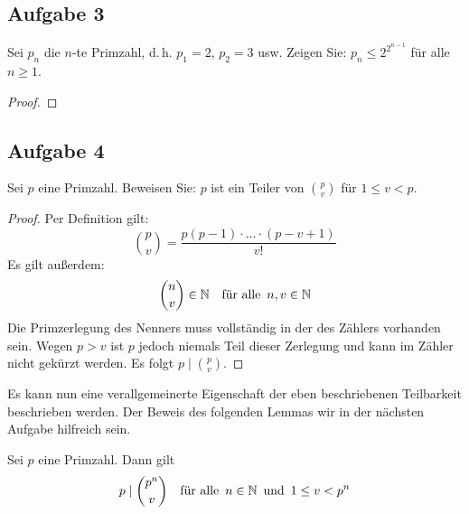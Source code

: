 \subsection{Aufgabe 3}
Sei $p_n$ die $n$-te Primzahl, d.\,h. $p_1 = 2$, $p_2 = 3$ usw. Zeigen Sie:
$p_n \leq 2^{2^{n - 1}}$ für alle $n \geq 1$.
\begin{proof}
\end{proof}

\subsection{Aufgabe 4}
Sei $p$ eine Primzahl. Beweisen Sie: $p$ ist ein Teiler von $\binom{p}{v}$
für $1 \leq v < p$.
\begin{proof}
  Per Definition gilt:
  \begin{equation*}
    \binom{p}{v} = \frac{p(p-1) \cdot \ldots \cdot (p - v + 1)}{v!}
  \end{equation*}
  Es gilt außerdem:
  \begin{equation*}
    \binom{n}{v} \in \mathbb{N}{} \quad
    \text{für alle} \enspace n,v \in \mathbb{N}{}
  \end{equation*}
  Die Primzerlegung des Nenners muss
  vollständig in der des Zählers vorhanden sein.
  Wegen $p > v$ ist $p$ jedoch niemals Teil dieser Zerlegung und
  kann im Zähler nicht gekürzt werden.
  Es folgt $p \mid \binom{p}{v}$.
\end{proof}
\noindent
Es kann nun eine verallgemeinerte Eigenschaft der eben beschriebenen
Teilbarkeit beschrieben werden. Der Beweis des folgenden Lemmas wir
in der nächsten Aufgabe hilfreich sein.
\begin{lemma}
  \label{lemma:p_divides_binom}
  Sei $p$ eine Primzahl. Dann gilt
  \begin{equation*}
    p \mid \binom{p^n}{v} \quad \text{für alle} \enspace n \in \mathbb{N}{}
    \enspace \text{und} \enspace 1 \leq v < p^n
  \end{equation*}
\end{lemma}
